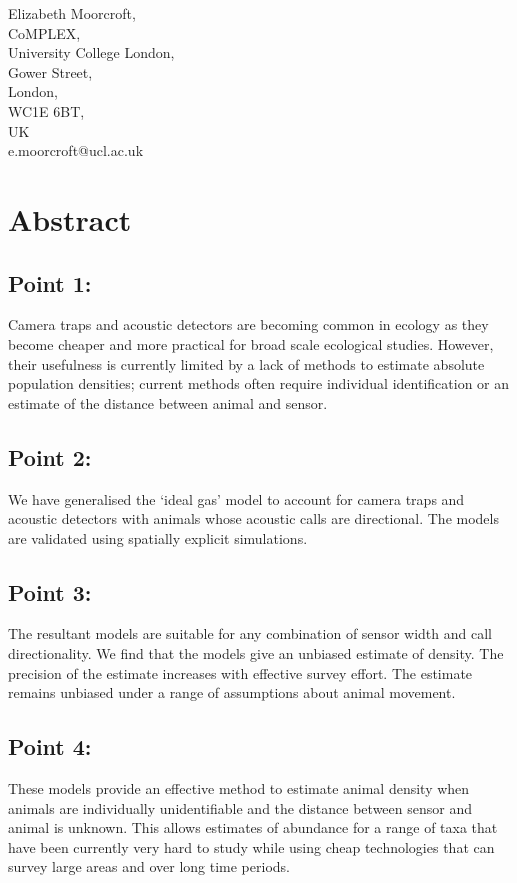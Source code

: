 \documentclass[a4paper,10pt,reqno,oneside]{amsart}
\begin{document}
Elizabeth Moorcroft,\\
CoMPLEX,\\
University College London,\\
Gower Street,\\
London,\\
WC1E 6BT, \\
UK\\
e.moorcroft@ucl.ac.uk\\

\clearpage



\section{Abstract}
\subsection*{Point 1:} Camera traps and acoustic detectors are becoming common in ecology as they become cheaper and more practical for broad scale ecological studies. However, their usefulness is currently limited by a lack of methods to estimate absolute population densities; current methods often require individual identification or an estimate of the distance between animal and sensor.

\subsection*{Point 2:} We have generalised the `ideal gas' model to account for camera traps and acoustic detectors with animals whose acoustic calls are directional. The models are validated using spatially explicit simulations. 

\subsection*{Point 3:} The resultant models are suitable for any combination of sensor width and call directionality. We find that the models give an unbiased estimate of density. The precision of the estimate increases with effective survey effort. The estimate remains unbiased under a range of assumptions about animal movement. 

\subsection*{Point 4:} These models provide an effective method to estimate animal density when animals are individually unidentifiable and the distance between sensor and animal is unknown. This allows estimates of abundance for a range of taxa that have been currently very hard to study while using cheap technologies that can survey large areas and over long time periods. 
\end{document}
